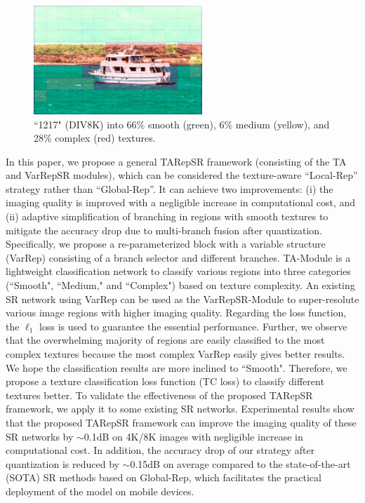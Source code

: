 \documentclass[sn-mathphys]{sn-jnl}%
\theoremstyle{thmstyleone}%
\theoremstyle{thmstyletwo}%
\theoremstyle{thmstylethree}%
\begin{document}
\begin{figure}
    \centering
    \includegraphics[width=2.5in]{1217_mask.png}
    \caption{``1217" (DIV8K) into 66\% smooth (green), 6\% medium (yellow), and 28\% complex (red) textures.}
    \label{texture_distribution}
\end{figure}

In this paper, we propose a general TARepSR framework (consisting of the TA and VarRepSR modules), which can be considered the texture-aware ``Local-Rep'' strategy rather than ``Global-Rep''. It can achieve two improvements: (i) the imaging quality is improved with a negligible increase in computational cost, and (ii) adaptive simplification of branching in regions with smooth textures to mitigate the accuracy drop due to multi-branch fusion after quantization. Specifically, we propose a re-parameterized block with a variable structure (VarRep) consisting of a branch selector and different branches. TA-Module is a lightweight classification network to classify various regions into three categories (``Smooth", ``Medium," and ``Complex") based on texture complexity. An existing SR network using VarRep can be used as the VarRepSR-Module to super-resolute various image regions with higher imaging quality. Regarding the loss function, the $\ell_1$ loss is used to guarantee the essential performance. Further, we observe that the overwhelming majority of regions are easily classified to the most complex textures because the most complex VarRep easily gives better results. We hope the classification results are more inclined to ``Smooth". Therefore, we propose a texture classification loss function (TC loss) to classify different textures better. To validate the effectiveness of the proposed TARepSR framework, we apply it to some existing SR networks. Experimental results show that the proposed TARepSR framework can improve the imaging quality of these SR networks by $\sim$0.1dB on 4K/8K images with negligible increase in computational cost. In addition, the accuracy drop of our strategy after quantization is reduced by $\sim$0.15dB on average compared to the state-of-the-art (SOTA) SR methods based on Global-Rep, which facilitates the practical deployment of the model on mobile devices.
\end{document}
